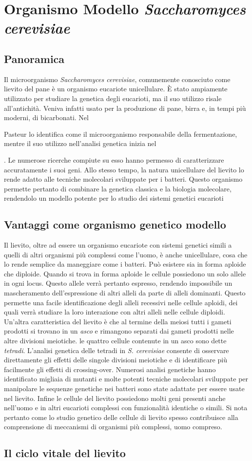 \section*{Organismo Modello \emph{Saccharomyces cerevisiae}}

	\subsection*{Panoramica}
	Il microorganismo \emph{Saccharomyces cerevisiae}, comunemente conosciuto come lievito del pane \`e un organismo eucariote unicellulare.
	\`E stato ampiamente utilizzato per studiare la genetica degli eucarioti, ma il suo utilizzo risale all'antichit\`a.
	Veniva infatti usato per la produzione di pane, birra e, in tempi pi\`u moderni, di bicarbonati.
	Nel \date{1857} Pasteur lo identifica come il microorganismo responsabile della fermentazione, mentre il suo utilizzo nell'analisi genetica inizia nel \date{1935}.
	Le numerose ricerche compiute su esso hanno permesso di caratterizzare accuratamente i suoi geni.
	Allo stesso tempo, la natura unicellulare del lievito lo rende adatto alle tecniche molecolari sviluppate per i batteri.
	Questo organismo permette pertanto di combinare la genetica classica e la biologia molecolare, rendendolo un modello potente per lo studio dei sistemi genetici eucarioti

	\subsection*{Vantaggi come organismo genetico modello}
	Il lievito, oltre ad essere un organismo eucariote con sistemi genetici simili a quelli di altri organismi pi\`u complessi come l'uomo, \`e anche unicellulare, cosa che lo rende semplice da maneggiare come i batteri.
	Pu\`o esistere sia in forma aploide che diploide.
	Quando si trova in forma aploide le cellule possiedono un solo allele in ogni locus.
	Questo allele verr\`a pertanto espresso, rendendo impossibile un mascheramento dell'espressione di altri alleli da parte di alleli dominanti.
	Questo permette una facile identificazione degli alleli recessivi nelle cellule aploidi, dei quali verr\`a studiare la loro interazione con altri alleli nelle cellule diploidi.
	Un'altra caratteristica del lievito \`e che al termine della meiosi tutti i gameti prodotti si trovano in un \emph{asco} e rimangono separati dai gameti prodotti nelle altre divisioni meiotiche.
	le quattro cellule contenute in un asco sono dette \emph{tetradi}.
	L'analisi genetica delle tetradi in \emph{S. cerevisiae} consente di osservare direttamente gli effetti delle singole divisioni meiotiche e di identificare pi\`u facilmente gli effetti di crossing-over.
	Numerosi analisi genetiche hanno identificato migliaia di mutanti e molte potenti tecniche molecolari sviluppate per manipolare le sequenze genetiche nei batteri sono state adattate per essere usate nel lievito.
	Infine le cellule del lievito possiedono molti geni presenti anche nell'uomo e in altri eucarioti complessi con funzionalit\`a identiche o simili.
	Si nota pertanto come lo studio genetico delle cellule di lievito spesso contribuisce alla comprensione di meccanismi di organismi pi\`u complessi, uomo compreso.

	\subsection*{Il ciclo vitale del lievito}

